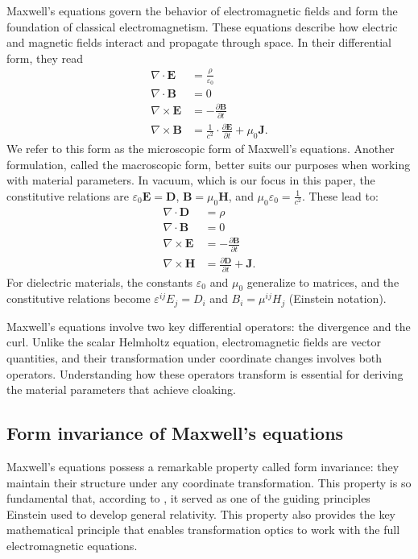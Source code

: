 Maxwell's equations govern the behavior of electromagnetic fields and form the
foundation of classical electromagnetism. These equations describe how electric
and magnetic fields interact and propagate through space. In their differential
form, they read
\begin{align*}
\nabla \cdot \boldsymbol{E} &= \frac{\rho}{\varepsilon_0}\\
\nabla \cdot \boldsymbol{B} &= 0\\
\nabla \times \boldsymbol{E} &= -\frac{\partial \boldsymbol{B}}{\partial t}\\
\nabla \times \boldsymbol{B} &=
\frac{1}{c^2}\cdot\frac{\partial \boldsymbol{E}}{\partial t}
+ \mu_0 \boldsymbol{J}.
\end{align*}
We refer to this form as the microscopic form of Maxwell's equations.
Another formulation, called the macroscopic form, better suits our purposes when
working with material parameters. In vacuum, which is our focus in this paper,
the constitutive relations are
\(\varepsilon_0\boldsymbol{E}=\boldsymbol{D}\),
\(\boldsymbol{B}=\mu_0\boldsymbol{H}\), and
\(\mu_0\varepsilon_0=\frac{1}{c^2}\). These lead to:
\begin{align*}
\nabla \cdot \boldsymbol{D} &= \rho\\
\nabla \cdot \boldsymbol{B} &= 0\\
\nabla \times \boldsymbol{E} &= -\frac{\partial \boldsymbol{B}}{\partial t}\\
\nabla \times \boldsymbol{H} &=  \frac{\partial \boldsymbol{D}}{\partial t}
+ \boldsymbol{J}.
\end{align*}
For dielectric materials, the constants \(\varepsilon_0\)
and \(\mu_0\) generalize to matrices, and the constitutive relations become
\(\varepsilon^{ij}E_j=D_i\) and \(B_i=\mu^{ij}H_j\) (Einstein notation).

Maxwell's equations involve two key differential
operators: the divergence and the curl. Unlike the scalar Helmholtz
equation, electromagnetic fields are
vector quantities, and their transformation under coordinate
changes involves both operators.
Understanding how these operators transform is essential for
deriving the material parameters that achieve cloaking.

\subsection{Form invariance of Maxwell's equations}

Maxwell's equations possess a remarkable property called form invariance: they
maintain their structure under any coordinate transformation. This property is
so fundamental that, according to \cite{mccallRoadmapTransformationOptics2018},
it served as one of the guiding principles Einstein used to develop general
relativity. This property also provides the key mathematical principle that
enables transformation optics to work with the full electromagnetic equations.

